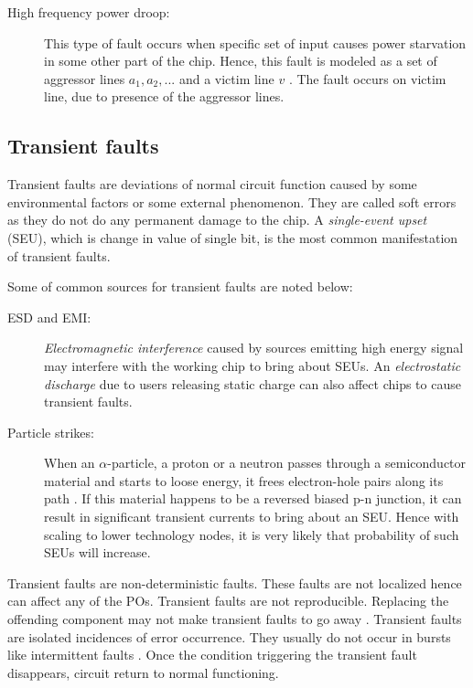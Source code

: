 \begin{description}
\item[High frequency power droop:] This type of fault occurs when specific set of input causes power starvation in some other part of the chip. Hence, this fault is modeled as a set of aggressor lines $a_1,a_2,...$ and a victim line $v$ \cite{Polian2007}. The fault occurs on victim line, due to presence of the aggressor lines.
\end{description}

\subsection{Transient faults}
\label{sec:sectf}
Transient faults are  deviations of normal circuit function caused by some  environmental factors or some external phenomenon. They are called soft errors as they do not do any permanent damage to the chip. A \emph{single-event upset} (SEU), which is change in value of single bit, is the most common manifestation of transient faults.


Some of common sources for transient faults are noted below:
\begin{description}
\item [ESD and EMI:] \emph{Electromagnetic interference} caused by sources emitting high energy signal may interfere with the working chip to bring about SEUs. An \emph{electrostatic discharge} due to users releasing static charge can also affect chips to cause transient faults.

\item[Particle strikes:] When an $\alpha$-particle, a proton or a neutron passes through a semiconductor material and starts to loose energy, it frees electron-hole pairs along its path \cite{Dodd2003}. If this material happens to be a reversed biased p-n junction, it can result in significant transient currents to bring about an SEU. Hence with scaling to lower technology nodes, it is very likely that probability of such SEUs will increase.

\end{description}


Transient faults are non-deterministic faults. These faults are not localized hence can affect any of the POs. Transient faults are not reproducible. Replacing the offending component may not make transient faults to go away \cite{Constantinescu2007}. Transient faults are isolated incidences of error occurrence. They usually do not occur in bursts like intermittent faults \cite{Constantinescu2007, Constantinescu2003}. Once the condition triggering the transient fault disappears, circuit return to normal functioning.

